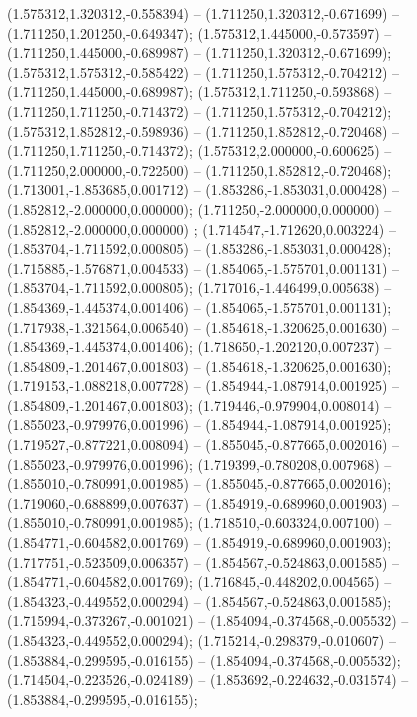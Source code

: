  (1.575312,1.320312,-0.558394) -- (1.711250,1.320312,-0.671699) -- (1.711250,1.201250,-0.649347);
 (1.575312,1.445000,-0.573597) -- (1.711250,1.445000,-0.689987) -- (1.711250,1.320312,-0.671699);
 (1.575312,1.575312,-0.585422) -- (1.711250,1.575312,-0.704212) -- (1.711250,1.445000,-0.689987);
 (1.575312,1.711250,-0.593868) -- (1.711250,1.711250,-0.714372) -- (1.711250,1.575312,-0.704212);
 (1.575312,1.852812,-0.598936) -- (1.711250,1.852812,-0.720468) -- (1.711250,1.711250,-0.714372);
 (1.575312,2.000000,-0.600625) -- (1.711250,2.000000,-0.722500) -- (1.711250,1.852812,-0.720468);
 (1.713001,-1.853685,0.001712) -- (1.853286,-1.853031,0.000428) -- (1.852812,-2.000000,0.000000);
 (1.711250,-2.000000,0.000000) -- (1.852812,-2.000000,0.000000) ;
 (1.714547,-1.712620,0.003224) -- (1.853704,-1.711592,0.000805) -- (1.853286,-1.853031,0.000428);
 (1.715885,-1.576871,0.004533) -- (1.854065,-1.575701,0.001131) -- (1.853704,-1.711592,0.000805);
 (1.717016,-1.446499,0.005638) -- (1.854369,-1.445374,0.001406) -- (1.854065,-1.575701,0.001131);
 (1.717938,-1.321564,0.006540) -- (1.854618,-1.320625,0.001630) -- (1.854369,-1.445374,0.001406);
 (1.718650,-1.202120,0.007237) -- (1.854809,-1.201467,0.001803) -- (1.854618,-1.320625,0.001630);
 (1.719153,-1.088218,0.007728) -- (1.854944,-1.087914,0.001925) -- (1.854809,-1.201467,0.001803);
 (1.719446,-0.979904,0.008014) -- (1.855023,-0.979976,0.001996) -- (1.854944,-1.087914,0.001925);
 (1.719527,-0.877221,0.008094) -- (1.855045,-0.877665,0.002016) -- (1.855023,-0.979976,0.001996);
 (1.719399,-0.780208,0.007968) -- (1.855010,-0.780991,0.001985) -- (1.855045,-0.877665,0.002016);
 (1.719060,-0.688899,0.007637) -- (1.854919,-0.689960,0.001903) -- (1.855010,-0.780991,0.001985);
 (1.718510,-0.603324,0.007100) -- (1.854771,-0.604582,0.001769) -- (1.854919,-0.689960,0.001903);
 (1.717751,-0.523509,0.006357) -- (1.854567,-0.524863,0.001585) -- (1.854771,-0.604582,0.001769);
 (1.716845,-0.448202,0.004565) -- (1.854323,-0.449552,0.000294) -- (1.854567,-0.524863,0.001585);
 (1.715994,-0.373267,-0.001021) -- (1.854094,-0.374568,-0.005532) -- (1.854323,-0.449552,0.000294);
 (1.715214,-0.298379,-0.010607) -- (1.853884,-0.299595,-0.016155) -- (1.854094,-0.374568,-0.005532);
 (1.714504,-0.223526,-0.024189) -- (1.853692,-0.224632,-0.031574) -- (1.853884,-0.299595,-0.016155);
